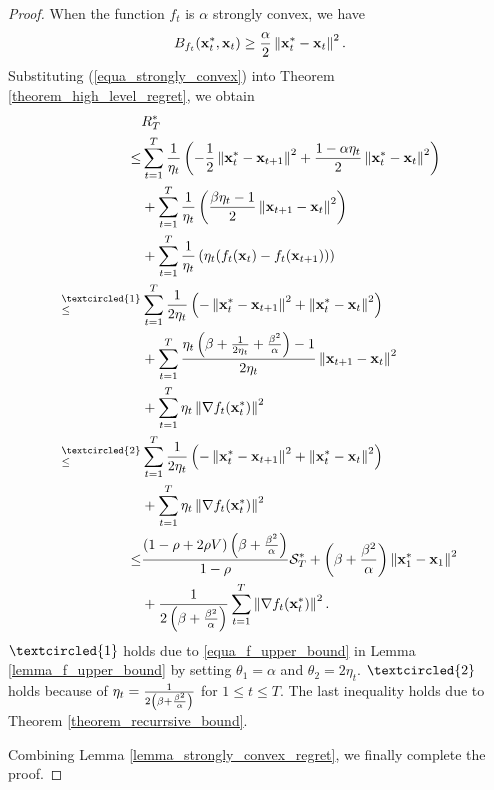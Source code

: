 \documentclass[journal]{IEEEtran}
\begin{document}
\begin{proof}

When the function $f_t$ is $\alpha$ strongly convex, we have 
\begin{align}
\label{equa_strongly_convex}
B_{f_t}(\x_t^{\ast}, \x_t) \ge \frac{\alpha}{2}\lrnorm{\x_t^{\ast} - \x_t}^2.
\end{align}  Substituting (\ref{equa_strongly_convex}) into Theorem \ref{theorem_high_level_regret}, we obtain 
\begin{align}
\nonumber
& R_T^{\ast} \\ \nonumber 
\le &  \sum\limits_{t=1}^{T} \frac{1}{\eta_t} \lrincir{  - \frac{1}{2} \lrnorm{\x_t^{\ast} - \x_{t+1}}^2   + \frac{1-\alpha\eta_t}{2} \lrnorm { \x_t^{\ast} - \x_t }^2 }  \\ \nonumber 
& +  \sum\limits_{t=1}^{T} \frac{1}{\eta_t} \lrincir{ \frac{\beta\eta_t-1}{2} \lrnorm{\x_{t+1} - \x_t}^2 } \\ \nonumber 
& + \sum\limits_{t=1}^{T} \frac{1}{\eta_t} \lrincir{\eta_t(f_t(\x_t) - f_t(\x_{t+1})) } \\ \nonumber
\refabovecir{\le}{\textcircled{1}} & \sum\limits_{t=1}^{T} \frac{1}{2\eta_t} \lrincir{ -  \lrnorm{\x_t^{\ast} - \x_{t+1}}^2   + \lrnorm { \x_t^{\ast} - \x_t }^2 } \\ \nonumber
& + \sum\limits_{t=1}^{T} \frac{\eta_t\left(\beta+\frac{1}{2\eta_t} + \frac{\beta^2}{\alpha}\right)-1}{2\eta_t} \lrnorm{\x_{t+1} - \x_t}^2  \\ \nonumber 
& + \sum\limits_{t=1}^{T}  \eta_t \lrnorm{\nabla f_t(\x_t^{\ast})}^2  \\ \nonumber
\refabovecir{\le}{\textcircled{2}} & \sum\limits_{t=1}^{T} \frac{1}{2\eta_t} \lrincir{  -  \lrnorm{\x_t^{\ast} - \x_{t+1}}^2   + \lrnorm { \x_t^{\ast} - \x_t }^2 } \\ \nonumber 
& +  \sum\limits_{t=1}^{T}\eta_t\lrnorm{\nabla f_t(\x_t^{\ast})}^2  \\ \nonumber
\le &  \frac{(1-\rho + 2\rho V)\lrincir{ \beta + \frac{\beta^2}{\alpha} }}{1-\rho} \Scal_T^{\ast} + \lrincir{ \beta + \frac{\beta^2}{\alpha} }\lrnorm{\x_1^{\ast} - \x_1}^2  \\ \nonumber 
& + \frac{1}{ 2\lrincir{ \beta + \frac{\beta^2}{\alpha} } }\sum\limits_{t=1}^{T} \lrnorm{\nabla f_t(\x_t^{\ast})}^2. 
\end{align} $\textcircled{1}$ holds due to \eqref{equa_f_upper_bound} in Lemma \ref{lemma_f_upper_bound} by setting $\theta_1 = \alpha$ and $\theta_2 = 2\eta_t$. $\textcircled{2}$ holds because of $\eta_t = \frac{1}{2\left( \beta+\frac{\beta^2}{\alpha} \right)}$ for $1\le t\le T$.  The last inequality holds due to Theorem \ref{theorem_recurrsive_bound}. 

Combining Lemma \ref{lemma_strongly_convex_regret}, we finally complete the proof.

\end{proof}
\end{document}
